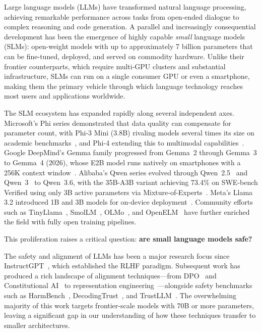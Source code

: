 \documentclass[12pt,a4paper]{article}
\begin{document}
Large language models (LLMs) have transformed natural language processing, achieving remarkable performance across tasks from open-ended dialogue to complex reasoning and code generation. A parallel and increasingly consequential development has been the emergence of highly capable \emph{small} language models (SLMs): open-weight models with up to approximately 7 billion parameters that can be fine-tuned, deployed, and served on commodity hardware. Unlike their frontier counterparts, which require multi-GPU clusters and substantial infrastructure, SLMs can run on a single consumer GPU or even a smartphone, making them the primary vehicle through which language technology reaches most users and applications worldwide.

The SLM ecosystem has expanded rapidly along several independent axes. Microsoft's Phi series demonstrated that data quality can compensate for parameter count, with Phi-3 Mini (3.8B) rivaling models several times its size on academic benchmarks~\citep{abdin2024phi3}, and Phi-4 extending this to multimodal capabilities~\citep{abdin2024phi4}. Google DeepMind's Gemma family progressed from Gemma~2 through Gemma~3 to Gemma~4 (2026), whose E2B model runs natively on smartphones with a 256K context window~\citep{gemma2024b,gemma2025,gemma2026}. Alibaba's Qwen series evolved through Qwen~2.5~\citep{qwen2024} and Qwen~3~\citep{qwen2025} to Qwen~3.6, with the 35B-A3B variant achieving 73.4\% on SWE-bench Verified using only 3B active parameters via Mixture-of-Experts~\citep{qwen2026_36}. Meta's Llama 3.2 introduced 1B and 3B models for on-device deployment~\citep{grattafiori2024llama3}. Community efforts such as TinyLlama~\citep{zhang2024tinyllama}, SmolLM~\citep{benallal2024smollm}, OLMo~\citep{groeneveld2024olmo}, and OpenELM~\citep{mehta2024openelm} have further enriched the field with fully open training pipelines.

This proliferation raises a critical question: \textbf{are small language models safe?}

The safety and alignment of LLMs has been a major research focus since InstructGPT~\citep{ouyang2022training}, which established the RLHF paradigm. Subsequent work has produced a rich landscape of alignment techniques---from DPO~\citep{rafailov2023direct} and Constitutional AI~\citep{bai2022constitutional} to representation engineering~\citep{zou2023representation}---alongside safety benchmarks such as HarmBench~\citep{mazeika2024harmbench}, DecodingTrust~\citep{wang2023decodingtrust}, and TrustLLM~\citep{huang2024trustllm}. The overwhelming majority of this work targets frontier-scale models with 70B or more parameters, leaving a significant gap in our understanding of how these techniques transfer to smaller architectures.
\end{document}
